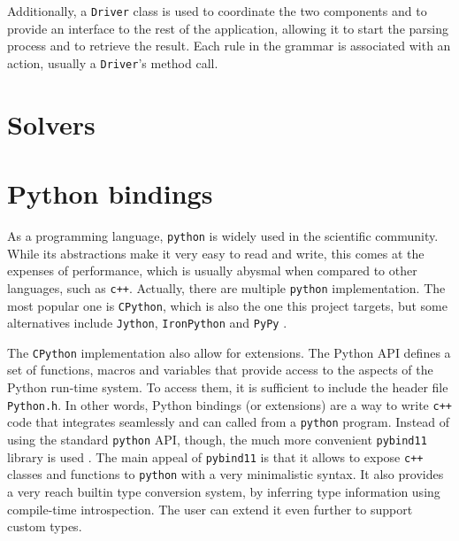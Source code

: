 Additionally, a \texttt{Driver} class is used to coordinate the two components and to provide an interface to the rest of the application, allowing it to start the parsing process and to retrieve the result.
Each rule in the grammar is associated with an action, usually a \texttt{Driver}'s method call.





\section{Solvers}


\section{Python bindings}

As a programming language, \texttt{python} is widely used in the scientific community.
While its abstractions make it very easy to read and write, this comes at the expenses of performance, which is usually abysmal when compared to other languages, such as \texttt{c++}.
Actually, there are multiple \texttt{python} implementation.
The most popular one is \texttt{CPython}, which is also the one this project targets, but some alternatives include \texttt{Jython}, \texttt{IronPython} and \texttt{PyPy} \cite{man:python-implementations}.

The \texttt{CPython} implementation also allow for extensions.
The Python API defines a set of functions, macros and variables that provide access to the aspects of the Python run-time system. 
To access them, it is sufficient to include the header file \texttt{Python.h}.
In other words, Python bindings (or extensions) are a way to write \texttt{c++} code that integrates seamlessly and can called from a \texttt{python} program.
Instead of using the standard \texttt{python} API, though, the much more convenient \texttt{pybind11} library is used \cite{man:pybind11}.
The main appeal of \texttt{pybind11} is that it allows to expose \texttt{c++} classes and functions to \texttt{python} with a very minimalistic syntax.
It also provides a very reach builtin type conversion system, by inferring type information using compile-time introspection.
The user can extend it even further to support custom types.

